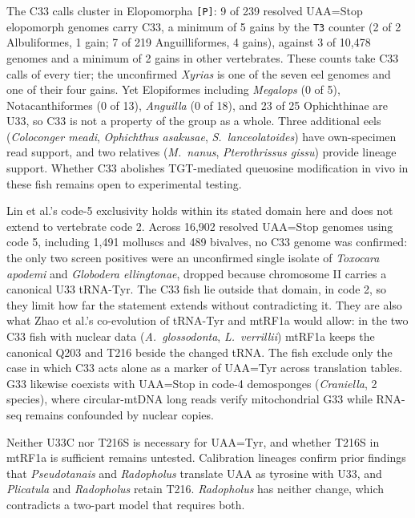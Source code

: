 \documentclass[11pt, a4paper]{article}
\begin{document}
The C33 calls cluster in Elopomorpha \texttt{[P]}: 9 of 239 resolved UAA=Stop elopomorph genomes carry C33, a minimum of 5 gains by the \texttt{T3} counter (2 of 2 Albuliformes, 1 gain; 7 of 219 Anguilliformes, 4 gains), against 3 of 10,478 genomes and a minimum of 2 gains in other vertebrates. These counts take C33 calls of every tier; the unconfirmed \textit{Xyrias} is one of the seven eel genomes and one of their four gains. Yet Elopiformes including \textit{Megalops} (0 of 5), Notacanthiformes (0 of 13), \textit{Anguilla} (0 of 18), and 23 of 25 Ophichthinae are U33, so C33 is not a property of the group as a whole. Three additional eels (\textit{Coloconger meadi}, \textit{Ophichthus asakusae}, \textit{S.\ lanceolatoides}) have own-specimen read support, and two relatives (\textit{M.\ nanus}, \textit{Pterothrissus gissu}) provide lineage support. Whether C33 abolishes TGT-mediated queuosine modification in vivo in these fish remains open to experimental testing.

Lin et al.'s code-5 exclusivity holds within its stated domain here and does not extend to vertebrate code 2. Across 16,902 resolved UAA=Stop genomes using code 5, including 1,491 molluscs and 489 bivalves, no C33 genome was confirmed: the only two screen positives were an unconfirmed single isolate of \textit{Toxocara apodemi} and \textit{Globodera ellingtonae}, dropped because chromosome II carries a canonical U33 tRNA-Tyr. The C33 fish lie outside that domain, in code 2, so they limit how far the statement extends without contradicting it. They are also what Zhao et al.'s co-evolution of tRNA-Tyr and mtRF1a would allow: in the two C33 fish with nuclear data (\textit{A.\ glossodonta}, \textit{L.\ verrillii}) mtRF1a keeps the canonical Q203 and T216 beside the changed tRNA. The fish exclude only the case in which C33 acts alone as a marker of UAA=Tyr across translation tables. G33 likewise coexists with UAA=Stop in code-4 demosponges (\textit{Craniella}, 2 species), where circular-mtDNA long reads verify mitochondrial G33 while RNA-seq remains confounded by nuclear copies.

Neither U33C nor T216S is necessary for UAA=Tyr, and whether T216S in mtRF1a is sufficient remains untested. Calibration lineages confirm prior findings that \textit{Pseudotanais} and \textit{Radopholus} translate UAA as tyrosine with U33, and \textit{Plicatula} and \textit{Radopholus} retain T216. \textit{Radopholus} has neither change, which contradicts a two-part model that requires both.
\end{document}
